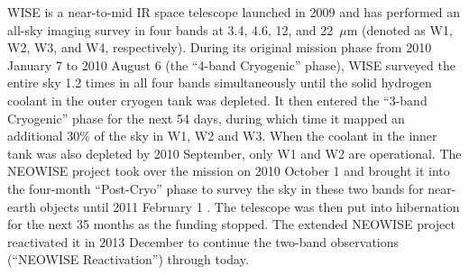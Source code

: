 \documentclass[apj,iop]{emulateapj}
\begin{document}



WISE \citep{Wright2010} is a near-to-mid IR space telescope launched in 2009 and has performed an all-sky imaging survey in four bands at 3.4, 4.6, 12, and 22~$\mu$m (denoted as W1, W2, W3, and W4, respectively). 
During its original mission phase from 2010 January 7 to 2010 August 6 (the “4-band Cryogenic” phase), WISE surveyed the entire sky 1.2 times in all four bands simultaneously until the solid hydrogen coolant in the outer cryogen tank was depleted. It then entered the “3-band Cryogenic” phase for the next 54 days, during which time it mapped an additional 30\% of the sky in W1, W2 and W3. When the coolant in the inner tank was also depleted by 2010 September, only W1 and W2 are operational. The NEOWISE project took over the mission on 2010 October 1 and brought it into the four-month “Post-Cryo” phase to survey the sky in these two bands for near-earth objects until 2011 February 1 \citep[see][]{2014LPI....45.2724M}. The telescope was then put into hibernation for the next 35 months as the funding stopped. The extended NEOWISE project reactivated it in 2013 December to continue the two-band observations (“NEOWISE Reactivation”) through today.
\end{document}

